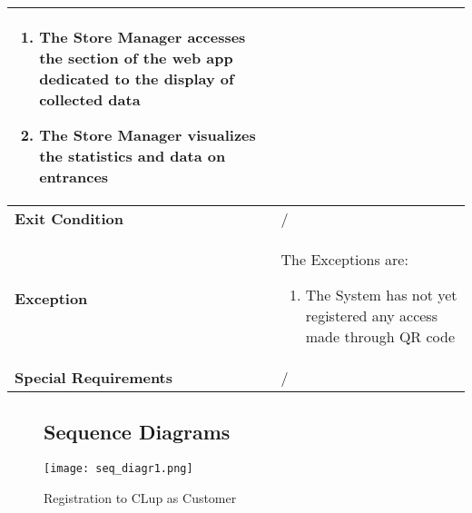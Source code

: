 \begin{enumerate}
{\begin{longtable}{|L{4cm}|L{10cm}|}
\begin{enumerate}
                        \item The Store Manager accesses the section of the web app dedicated to the display of collected data
                        \item The Store Manager visualizes the statistics and data on entrances
                    \end{enumerate} \\
                \hline
                \textbf{Exit Condition} & / \\
                \hline
                \textbf{Exception} & The Exceptions are: \begin{enumerate}
                        \item The System has not yet registered any access made through QR code
                    \end{enumerate} \\
                \hline
                \textbf{Special Requirements} & / \\
                \hline
            \end{longtable}}            
        \end{enumerate}

\begin{comment}
    \begin{figure}
        \begin{minipage}[b]{8.5cm}
        \centering
        \texttt{[image: fig1.png]}
        \caption{first}
        \end{minipage}
        \ \hspace{2mm} \hspace{3mm} \
        \begin{minipage}[b]{8.5cm}
        \centering
        \texttt{[image: fig2.png]}
        \caption{second}
        \end{minipage}
    \end{figure}
\end{comment}

\begin{figure}
    \subsection{Sequence Diagrams}
    \vspace{1cm}
    \centering
    \texttt{[image: seq\_diagr1.png]}
    \caption{Registration to CLup as Customer}
\end{figure}

